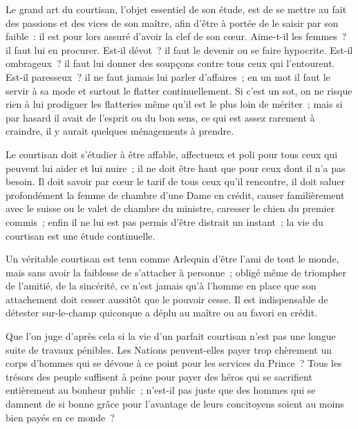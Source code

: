 \documentclass[french,twoside]{book} %
\begin{document}
Le grand art du courtisan, l’objet essentiel de son étude, est de se mettre au fait des passions et des vices de son maître, afin d’être à portée de le saisir par son faible : il est pour lors assuré d’avoir la clef de son cœur. Aime-t-il les femmes ? il faut lui en procurer. Est-il dévot ? il faut le devenir ou se faire hypocrite. Est-il ombrageux ? il faut lui donner des soupçons contre tous ceux qui l’entourent. Est-il paresseux ? il ne faut jamais lui parler d’affaires ; en un mot il faut le servir à sa mode et surtout le flatter continuellement. Si c’est un sot, on ne risque rien à lui prodiguer les flatteries même qu’il est le plus loin de mériter ; mais si par hasard il avait de l’esprit ou du bon sens, ce qui est assez rarement à craindre, il y aurait quelques ménagements à prendre.\par
Le courtisan doit s’étudier à être affable, affectueux et poli pour tous ceux qui peuvent lui aider et lui nuire ; il ne doit être haut que pour ceux dont il n’a pas besoin. Il doit savoir par cœur le tarif de tous ceux qu’il rencontre, il doit saluer profondément la femme de chambre d’une Dame en crédit, causer familièrement avec le suisse ou le valet de chambre du ministre, caresser le chien du premier commis ; enfin il ne lui est pas permis d’être distrait un instant ; la vie du courtisan est une étude continuelle.\par
Un véritable courtisan est tenu comme Arlequin d’être l’ami de tout le monde, mais sans avoir la faiblesse de s’attacher à personne ; obligé même de triompher de l’amitié, de la sincérité, ce n’est jamais qu’à l’homme en place que son attachement doit cesser aussitôt que le pouvoir cesse. Il est indispensable de détester sur-le-champ quiconque a déplu au maître ou au favori en crédit.\par
Que l’on juge d’après cela si la vie d’un parfait courtisan n’est pas une longue suite de travaux pénibles. Les Nations peuvent-elles payer trop chèrement un corps d’hommes qui se dévoue à ce point pour les services du Prince ? Tous les trésors des peuple suffisent à peine pour payer des héros qui se sacrifient entièrement au bonheur public ; n’est-il pas juste que des hommes qui se damnent de si bonne grâce pour l’avantage de leurs concitoyens soient au moins bien payés en ce monde ?\par
\end{document}
